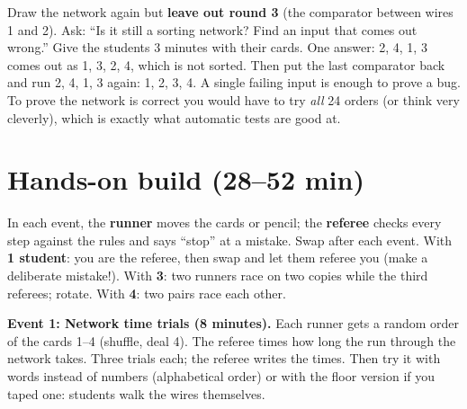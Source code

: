 \begin{bughunt}
Draw the network again but \textbf{leave out round 3} (the comparator between wires 1 and 2). Ask: \enquote{Is it still a sorting network? Find an input that comes out wrong.} Give the students 3 minutes with their cards. One answer: 2, 4, 1, 3 comes out as 1, 3, 2, 4, which is not sorted. Then put the last comparator back and run 2, 4, 1, 3 again: 1, 2, 3, 4. A single failing input is enough to prove a bug. To prove the network is correct you would have to try \emph{all} 24 orders (or think very cleverly), which is exactly what automatic tests are good at.
\end{bughunt}

\section{Hands-on build (28--52 min)}
\begin{pairroles}
In each event, the \textbf{runner} moves the cards or pencil; the \textbf{referee} checks every step against the rules and says \enquote{stop} at a mistake. Swap after each event.
With \textbf{1 student}: you are the referee, then swap and let them referee you (make a deliberate mistake!). With \textbf{3}: two runners race on two copies while the third referees; rotate. With \textbf{4}: two pairs race each other.
\end{pairroles}

\textbf{Event 1: Network time trials (8 minutes).} Each runner gets a random order of the cards 1--4 (shuffle, deal 4). The referee times how long the run through the network takes. Three trials each; the referee writes the times. Then try it with words instead of numbers (alphabetical order) or with the floor version if you taped one: students walk the wires themselves.

